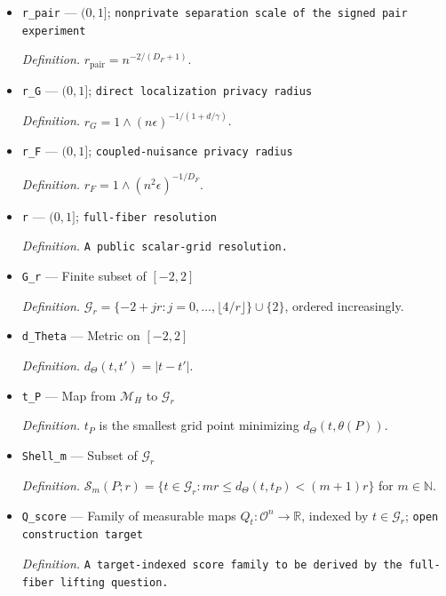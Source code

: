 \documentclass{article}
\begin{document}
\begin{itemize}
  \par\smallskip\noindent\emph{Definition.} \(D_F=1+d/\gamma+d/q\).
  \item \texttt{r\_\allowbreak{}pair} --- \((0,1]\); \texttt{nonprivate separation scale of the signed pair experiment}
  \par\smallskip\noindent\emph{Definition.} \(r_{\mathrm{pair}}=n^{-2/(D_F+1)}\).
  \item \texttt{r\_\allowbreak{}G} --- \((0,1]\); \texttt{direct localization privacy radius}
  \par\smallskip\noindent\emph{Definition.} \(r_G=1\wedge(n\epsilon)^{-1/(1+d/\gamma)}\).
  \item \texttt{r\_\allowbreak{}F} --- \((0,1]\); \texttt{coupled-\allowbreak{}nuisance privacy radius}
  \par\smallskip\noindent\emph{Definition.} \(r_F=1\wedge(n^2\epsilon)^{-1/D_F}\).
  \item \texttt{r} --- \((0,1]\); \texttt{full-\allowbreak{}fiber resolution}
  \par\smallskip\noindent\emph{Definition.} \texttt{A public scalar-\allowbreak{}grid resolution.}
  \item \texttt{G\_\allowbreak{}r} --- Finite subset of \([-2,2]\)
  \par\smallskip\noindent\emph{Definition.} \(\mathcal G_r=\{-2+jr:j=0,\ldots,\lfloor4/r\rfloor\}\cup\{2\}\), ordered increasingly.
  \item \texttt{d\_\allowbreak{}Theta} --- Metric on \([-2,2]\)
  \par\smallskip\noindent\emph{Definition.} \(d_\Theta(t,t')=|t-t'|\).
  \item \texttt{t\_\allowbreak{}P} --- Map from \(\mathcal M_H\) to \(\mathcal G_r\)
  \par\smallskip\noindent\emph{Definition.} \(t_P\) is the smallest grid point minimizing \(d_\Theta(t,\theta(P))\).
  \item \texttt{Shell\_\allowbreak{}m} --- Subset of \(\mathcal G_r\)
  \par\smallskip\noindent\emph{Definition.} \(\mathcal S_m(P;r)=\{t\in\mathcal G_r:mr\le d_\Theta(t,t_P)<(m+1)r\}\) for \(m\in\mathbb N\).
  \item \texttt{Q\_\allowbreak{}score} --- Family of measurable maps \(Q_t:\mathcal O^n\to\mathbb R\), indexed by \(t\in\mathcal G_r\); \texttt{open construction target}
  \par\smallskip\noindent\emph{Definition.} \texttt{A target-\allowbreak{}indexed score family to be derived by the full-\allowbreak{}fiber lifting question.}

\end{itemize}
\end{document}
